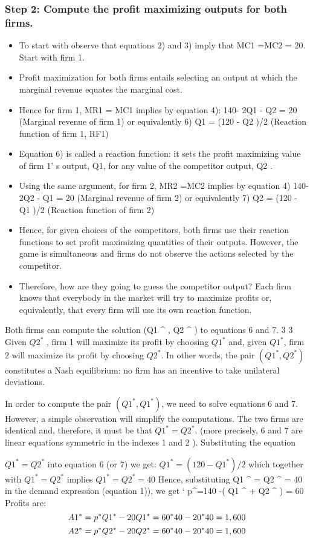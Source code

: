 \documentclass[]{article}
\begin{document}
\subsubsection{Step 2: Compute the profit maximizing outputs for both firms.}
\begin{itemize}
    \item To start with observe that equations 2) and 3) imply that MC1 =MC2 = 20.
Start with firm 1. 
\item Profit maximization for both firms entails selecting an output at which
the marginal revenue equates the marginal cost. 
\item Hence for firm 1, MR1 = MC1 implies by
equation 4):
 140- 2Q1 - Q2 = 20 (Marginal revenue of firm 1)
or equivalently
6) Q1 = (120 - Q2 )/2 (Reaction function of firm 1, RF1)
\item Equation 6) is called a reaction function: it sets the profit maximizing value of firm 1’ s
output, Q1, for any value of the competitor output, Q2 .
\item Using the same argument, for firm 2, MR2 =MC2 implies by equation 4)
 140- 2Q2 - Q1 = 20 (Marginal revenue of firm 2)
or equivalently
7) Q2 = (120 - Q1 )/2 (Reaction function of firm 2)
\item Hence, for given choices of the competitors, both firms use their reaction
functions to set profit maximizing quantities of their outputs. However, the game is
simultaneous and firms do not observe the actions selected by the competitor. 
\item Therefore,
how are they going to guess the competitor output? Each firm knows that everybody in
the market will try to maximize profits or, equivalently, that every firm will use its own
reaction function.
\end{itemize}
 Both firms can compute the solution (Q1
^{\ast}
, Q2
^{\ast}
 ) to equations 6 and 7. 
3
3
Given $Q2^{\ast}$
, firm 1 will maximize its profit by choosing $Q1^{\ast}$ and, given $Q1^{\ast}$, firm 2 will
maximize its profit by choosing $Q2^{\ast}$. 
In other words, the pair $(Q1^{\ast}, Q2^{\ast})$ constitutes a
Nash equilibrium: no firm has an incentive to take unilateral deviations.

In order to compute the pair $(Q1
^{\ast}, Q1^{\ast})$, we need to solve equations 6 and 7.
However, a simple observation will simplify the computations. The two firms are
identical and, therefore, it must be that $Q1^{\ast}= Q2^{\ast}$. (more precisely, 6 and 7 are linear
equations symmetric in the indexes 1 and 2 ). Substituting the equation 

$Q1^{\ast}= Q2^{\ast}$
 into
equation 6 (or 7) we get:
$Q1^{\ast}= (120 - Q1^{\ast})/2$
which together with $Q1^{\ast}= Q2^{\ast}$ implies $Q1^{\ast}= Q2^{\ast} = 40$
Hence, substituting Q1
^{\ast}
= Q2
^{\ast}
 = 40 in the demand expression (equation 1)), we get
` p^{\ast}=140 -( Q1
^{\ast}
+ Q2
^{\ast}
 ) = 60
Profits are:
\[
A1^{\ast}  = p^{\ast} Q1^{\ast}- 20 Q1^{\ast}\\
 = 60^{\ast}40 - 20^{\ast}40\\ = 1,600
\]
\[A2
^{\ast}
 = p^{\ast} Q2
^{\ast}
- 20 Q2
^{\ast}
\\ = 60^{\ast}40 - 20^{\ast}40 \\ = 1,600\]
\end{document}
